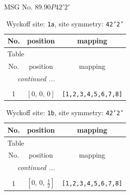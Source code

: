 \documentclass[fleqn,8pt]{jsarticle}
\begin{document}
\setcounter{MaxMatrixCols}{32}

\renewcommand{\tablename}{Table~}
\renewcommand{\figurename}{Figure~}
\begin{center}
\LARGE
MSG No. 89.90\quad$P42'2'$
\end{center}
\renewcommand{\arraystretch}{1.2}
\begin{longtable}{ccc}
\caption{Wyckoff site: {\tt 1a}, site symmetry: {\tt 42'2'}}
 \\
 \hline \hline
No. & position & mapping \\ \hline \endfirsthead

\multicolumn{2}{l}{\tablename\ \thetable{}} \\
 \hline \hline
No. & position & mapping \\ \hline \endhead

 \hline \hline
\multicolumn{2}{r}{\footnotesize\it continued ...} \\ \endfoot

 \hline \hline
\multicolumn{2}{r}{} \\ \endlastfoot

1 & $\left[ 0,\, 0,\, 0 \right]$ & {\tt [1,2,3,4,5,6,7,8]} \\
\end{longtable}
\renewcommand{\arraystretch}{1.2}
\begin{longtable}{ccc}
\caption{Wyckoff site: {\tt 1b}, site symmetry: {\tt 42'2'}}
 \\
 \hline \hline
No. & position & mapping \\ \hline \endfirsthead

\multicolumn{2}{l}{\tablename\ \thetable{}} \\
 \hline \hline
No. & position & mapping \\ \hline \endhead

 \hline \hline
\multicolumn{2}{r}{\footnotesize\it continued ...} \\ \endfoot

 \hline \hline
\multicolumn{2}{r}{} \\ \endlastfoot

1 & $\left[ 0,\, 0,\, \frac{1}{2} \right]$ & {\tt [1,2,3,4,5,6,7,8]} \\
\end{longtable}
\renewcommand{\arraystretch}{1.2}
\end{document}
